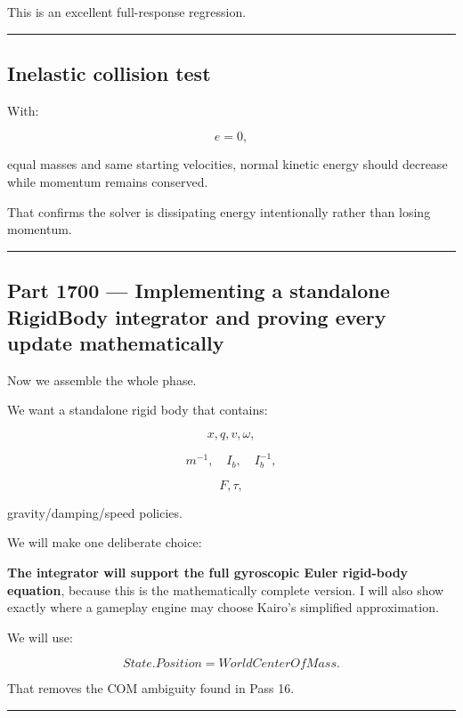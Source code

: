 This is an excellent full-response regression.

\begin{center}\rule{0.5\linewidth}{0.5pt}\end{center}

\subsection{Inelastic collision test}\label{06-engine-ii-ch039-inelastic-collision-test}

With:

\[
e=0,
\]

equal masses and same starting velocities, normal kinetic energy should decrease while momentum remains conserved.

That confirms the solver is dissipating energy intentionally rather than losing momentum.

\begin{center}\rule{0.5\linewidth}{0.5pt}\end{center}

\subsection{Part 1700 --- Implementing a standalone RigidBody integrator and proving every update mathematically}\label{06-engine-ii-ch039-part-1700-implementing-a-standalone-rigidbody-integrator-and-proving-every-update-mathematically}

Now we assemble the whole phase.

We want a standalone rigid body that contains:

\[
x,q,v,\omega,
\]

\[
m^{-1},
\quad
I_b,
\quad
I_b^{-1},
\]

\[
F,\tau,
\]

gravity/damping/speed policies.

We will make one deliberate choice:

\textbf{The integrator will support the full gyroscopic Euler rigid-body equation}, because this is the mathematically complete version. I will also show exactly where a gameplay engine may choose Kairo's simplified approximation.

We will use:

\[
State.Position
=
WorldCenterOfMass.
\]

That removes the COM ambiguity found in Pass 16.

\begin{center}\rule{0.5\linewidth}{0.5pt}\end{center}

